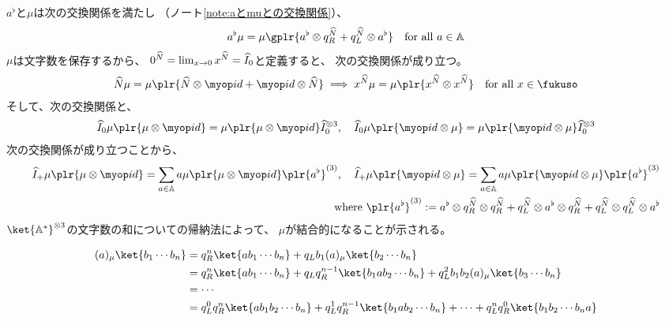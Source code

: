 {	$a^\flat$と$\mu$は次の交換関係を満たし
	（ノート\ref{note:aとmuとの交換関係}）、
	\begin{equation*}\begin{split}
		a^\flat\mu = \mu\gplr{a^\flat\otimes q_R^\Nhat 
			+ q_L^\Nhat\otimes a^\flat} \quad\text{for all } a\in\setA
	\end{split}\end{equation*}
	$\mu$は文字数を保存するから、
	$0^{\widehat{N}} = \lim_{x\to0} x^{\widehat{N}} = {\widehat{I}}_0$と定義すると、
	次の交換関係が成り立つ。
	\begin{equation*}\begin{split}
		\Nhat\mu = \mu\plr{\Nhat\otimes\id + \id\otimes\Nhat}
		\implies x^\Nhat\mu = \mu\plr{x^\Nhat\otimes x^\Nhat} 
		\quad\text{for all } x\in\fukuso
	\end{split}\end{equation*}
	そして、次の交換関係と、
	\begin{equation*}\begin{split}
		\Ihat_0\mu\plr{\mu\otimes\id} 
			= \mu\plr{\mu\otimes\id}\Ihat_0^{\otimes3} ,\quad 
		\Ihat_0\mu\plr{\id\otimes\mu}
			= \mu\plr{\id\otimes\mu}\Ihat_0^{\otimes3} \\
	\end{split}\end{equation*}
	次の交換関係が成り立つことから、
	\begin{equation*}\begin{split}
		\Ihat_+\mu\plr{\mu\otimes\id} = \sum_{a\in\setA} a\mu
			\plr{\mu\otimes\id} \plr{a^\flat}^{(3)} ,\quad 
		\Ihat_+\mu\plr{\id\otimes\mu} = \sum_{a\in\setA} a\mu
			\plr{\id\otimes\mu} \plr{a^\flat}^{(3)} \\
		\quad\text{where } \plr{a^\flat}^{(3)} 
			:= a^\flat\otimes q_R^\Nhat\otimes q_R^\Nhat
			+ q_L^\Nhat\otimes a^\flat\otimes q_R^\Nhat
			+ q_L^\Nhat\otimes q_L^\Nhat\otimes a^\flat
	\end{split}\end{equation*}
	$\ket{\setA^*}^{\otimes3}$の文字数の和についての帰納法によって、
	$\mu$が結合的になることが示される。

	\begin{note}\label{note:作用素(a)_muの計算} %
		\begin{equation*}\begin{split}
			(a)_\mu\ket{b_1\cdots b_n} 
			&= q_R^n\ket{ab_1\cdots b_n} + q_Lb_1(a)_\mu\ket{b_2\cdots b_n} \\
			&= q_R^n\ket{ab_1\cdots b_n} + q_Lq_R^{n-1}\ket{b_1ab_2\cdots b_n}
			+ q_L^2b_1b_2(a)_\mu\ket{b_3\cdots b_n} \\
			&= \cdots \\
			&= q_L^0q_R^n\ket{ab_1b_2\cdots b_n}
			+ q_L^1q_R^{n-1}\ket{b_1ab_2\cdots b_n}
			+\cdots
			+ q_L^nq_R^0\ket{b_1b_2\cdots b_na}
		\end{split}\end{equation*}
	\end{note} %

}
